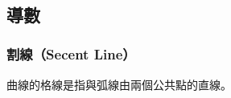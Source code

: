 \documentclass[11pt]{article}
\begin{document}
    \begin{center}
    \end{center}
    { \hspace*{\fill} \\}
    
    \hypertarget{ux5c0eux6578}{%
\subsection{導數}\label{ux5c0eux6578}}

\hypertarget{ux5272ux7ddasecent-line}{%
\subsubsection{割線（Secent Line）}\label{ux5272ux7ddasecent-line}}

曲線的格線是指與弧線由兩個公共點的直線。
\end{document}
